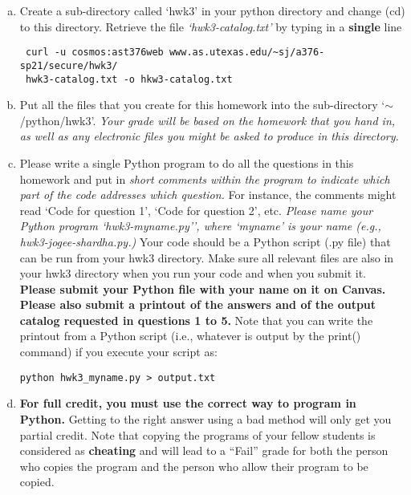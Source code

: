 \documentclass[11pt]{article}    %
\begin{document}
\begin{enumerate}[(a)]

\item 
\vspace{2.0 mm}
\noindent
Create a sub-directory called `hwk3' in your python directory and change 
(cd) to this directory. 
Retrieve the file {\it `hwk3-catalog.txt'}  by typing   in a {\bf single} line 
\begin{lstlisting}
 curl -u cosmos:ast376web www.as.utexas.edu/~sj/a376-sp21/secure/hwk3/
 hwk3-catalog.txt -o hkw3-catalog.txt
\end{lstlisting}

\item 
\noindent
Put all the files that you create for this homework into the 
sub-directory  `$\sim$/python/hwk3'.
{\it Your grade will be based  on the homework that 
you hand in, as well as any electronic files you might be asked to 
produce in this directory.}

\item 
\noindent
Please write a single Python program 
to do all the questions in this homework and put in 
{\it {short comments within the program to indicate which part of the code 
addresses which question.}} For instance, the comments might read `Code
for question 1',  `Code for  question 2', etc. 
{\it{ Please name your Python program    `hwk3-myname.py'', where  `myname' is  
your name  (e.g.,   hwk3-jogee-shardha.py.)}}  
Your code should be a Python script (.py file) that can be run from your hwk3 directory. Make 
sure all relevant files are also in your hwk3 directory when you run your code and when you submit
it.
{\bf{Please submit your Python file with your name
on it on Canvas. Please also submit a printout of the answers and of the output catalog  
requested in questions 1 to 5.}}
\clearpage
Note that you can write the printout from a Python script (i.e., whatever is output by the print() command) if you execute your script as:

\begin{lstlisting}
python hwk3_myname.py > output.txt
\end{lstlisting}

\item 
\noindent
{\bf{
For full credit, you must use the correct  way to program
in Python.}} Getting to the right answer using a bad method will 
only get you  partial credit. 
Note that copying the programs of your fellow students is considered 
as {\bf cheating} and will lead to a ``Fail'' grade for both
the person who copies the program and the person who allow 
their program to be copied.

\end{enumerate}
\end{document}
